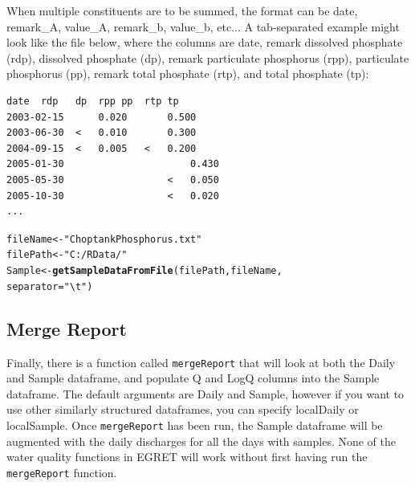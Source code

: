 \documentclass[a4paper,11pt]{article}\usepackage[]{graphicx}\usepackage[]{color}
\makeatletter
\newcommand{\hlstr}[1]{\textcolor[rgb]{0.192,0.494,0.8}{#1}}%
\newcommand{\hlstd}[1]{\textcolor[rgb]{0.345,0.345,0.345}{#1}}%
\newcommand{\hlkwb}[1]{\textcolor[rgb]{0.69,0.353,0.396}{#1}}%
\newcommand{\hlkwc}[1]{\textcolor[rgb]{0.333,0.667,0.333}{#1}}%
\newcommand{\hlkwd}[1]{\textcolor[rgb]{0.737,0.353,0.396}{\textbf{#1}}}%
\newenvironment{kframe}{%
 \def\at@end@of@kframe{}%
 \ifinner\ifhmode%
  \def\at@end@of@kframe{\end{minipage}}%
  \begin{minipage}{\columnwidth}%
 \fi\fi%
 \def\FrameCommand##1{\hskip\@totalleftmargin \hskip-\fboxsep
 \colorbox{shadecolor}{##1}\hskip-\fboxsep
     \hskip-\linewidth \hskip-\@totalleftmargin \hskip\columnwidth}%
 \MakeFramed {\advance\hsize-\width
   \@totalleftmargin\z@ \linewidth\hsize
   \@setminipage}}%
 {\par\unskip\endMakeFramed%
 \at@end@of@kframe}
\newenvironment{knitrout}{}{} %
\makeatother
\begin{document}
When multiple constituents are to be summed, the format can be date, remark\_A, value\_A, remark\_b, value\_b, etc... A tab-separated example might look like the file below, where the columns are date, remark dissolved phosphate (rdp), dissolved phosphate (dp), remark particulate phosphorus (rpp), particulate phosphorus (pp), remark total phosphate (rtp), and total phosphate (tp):

\singlespacing
\begin{verbatim}
date  rdp	dp	rpp	pp	rtp	tp
2003-02-15		0.020		0.500		
2003-06-30	<	0.010		0.300		
2004-09-15	<	0.005	<	0.200		
2005-01-30						0.430
2005-05-30					<	0.050
2005-10-30					<	0.020
...
\end{verbatim}
\doublespacing
\begin{knitrout}
\color{fgcolor}\begin{kframe}
\begin{alltt}
\hlstd{fileName} \hlkwb{<-} \hlstr{"ChoptankPhosphorus.txt"}
\hlstd{filePath} \hlkwb{<-}  \hlstr{"C:/RData/"}
\hlstd{Sample} \hlkwb{<-} \hlkwd{getSampleDataFromFile}\hlstd{(filePath,fileName,}
                                \hlkwc{separator}\hlstd{=}\hlstr{"\textbackslash{}t"}\hlstd{)}
\end{alltt}
\end{kframe}
\end{knitrout}


\FloatBarrier

\subsection{Merge Report}
Finally, there is a function called \texttt{mergeReport} that will look at both the Daily and Sample dataframe, and populate Q and LogQ columns into the Sample dataframe. The default arguments are Daily and Sample, however if you want to use other similarly structured dataframes, you can specify localDaily or localSample. Once \texttt{mergeReport} has been run, the Sample dataframe will be augmented with the daily discharges for all the days with samples.  None of the water quality functions in EGRET will work without first having run the \texttt{mergeReport} function.
\end{document}
